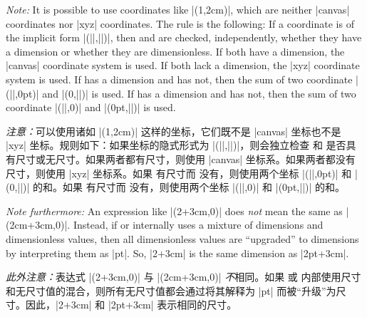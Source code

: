 \emph{Note:} It is possible to use coordinates like |(1,2cm)|, which are
neither |canvas| coordinates nor |xyz| coordinates. The rule is the following:
If a coordinate is of the implicit form |(||,||)|, then
 and  are checked, independently, whether they have a dimension
or whether they are dimensionless. If both have a dimension, the |canvas|
coordinate system is used. If both lack a dimension, the |xyz| coordinate
system is used. If  has a dimension and  has not, then the sum
of two coordinate |(||,0pt)| and |(0,||)| is used. If 
has a dimension and  has not, then the sum of two coordinate
|(||,0)| and |(0pt,||)| is used.

\emph{注意：}可以使用诸如 |(1,2cm)| 这样的坐标，它们既不是 |canvas| 坐标也不是 |xyz| 坐标。规则如下：如果坐标的隐式形式为 |(||,||)|，则会独立检查  和  是否具有尺寸或无尺寸。如果两者都有尺寸，则使用 |canvas| 坐标系。如果两者都没有尺寸，则使用 |xyz| 坐标系。如果  有尺寸而  没有，则使用两个坐标 |(||,0pt)| 和 |(0,||)| 的和。如果  有尺寸而  没有，则使用两个坐标 |(||,0)| 和 |(0pt,||)| 的和。


\emph{Note furthermore:} An expression like |(2+3cm,0)| does \emph{not} mean
the same as |(2cm+3cm,0)|. Instead, if  or  internally uses a
mixture of dimensions and dimensionless values, then all dimensionless values
are ``upgraded'' to dimensions by interpreting them as |pt|. So, |2+3cm| is the
same dimension as |2pt+3cm|.

\emph{此外注意：}表达式 |(2+3cm,0)| 与 |(2cm+3cm,0)| \emph{不}相同。如果  或  内部使用尺寸和无尺寸值的混合，则所有无尺寸值都会通过将其解释为 |pt| 而被``升级''为尺寸。因此，|2+3cm| 和 |2pt+3cm| 表示相同的尺寸。


